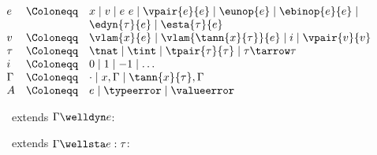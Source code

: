 \begin{flushleft}

\\
$\begin{array}{l c l}
  e & \Coloneqq & x \mid v \mid e~e \mid \vpair{e}{e} \mid \eunop{e} \mid \ebinop{e}{e} \mid
\\ & &            \edyn{\tau}{e} \mid \esta{\tau}{e}
\\
  v & \Coloneqq & \vlam{x}{e} \mid \vlam{\tann{x}{\tau}}{e} \mid i \mid \vpair{v}{v}
\\
  \tau & \Coloneqq & \tnat \mid \tint \mid \tpair{\tau}{\tau} \mid \tau \tarrow \tau
\\
  i & \Coloneqq & 0 \mid 1 \mid -1 \mid \ldots
\\
  \Gamma & \Coloneqq & \cdot \mid x,\Gamma \mid \tann{x}{\tau},\Gamma
\\
  A & \Coloneqq & e \mid \typeerror \mid \valueerror
\end{array}$

\medskip
\begin{minipage}[t]{0.5\columnwidth}
~~extends $\Gamma \welldyn e$:\\
\begin{mathpar}
\end{mathpar}
\end{minipage}%
\begin{minipage}[t]{0.5\columnwidth}
~~extends $\Gamma \wellsta e : \tau$:\\
\begin{mathpar}

\end{mathpar}
\end{minipage}

\end{flushleft}
